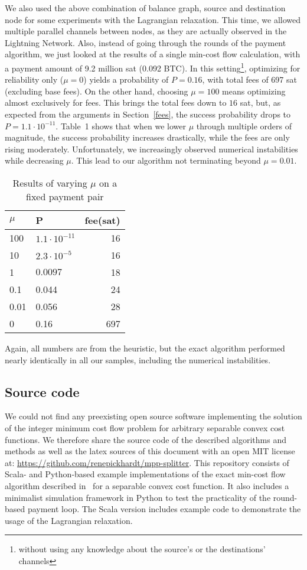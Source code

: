 \documentclass[10pt,twocolumn]{article}
\begin{document}
We also used the above combination of balance graph, source and destination node for some experiments with the Lagrangian relaxation. This time, we allowed multiple parallel channels between nodes, as they are actually observed in the Lightning Network. Also, instead of going through the rounds of the payment algorithm, we just looked at the results of a single min-cost flow calculation, with a payment amount of 9.2 million sat (0.092 BTC). In this setting\footnote{without using any knowledge about the source's or the destinations' channels}, optimizing for reliability only ($\mu=0$) yields a probability of $P=0.16$, with total fees of 697 sat (excluding base fees). On the other hand, choosing $\mu=100$ means optimizing almost exclusively for fees. This brings the total fees down to $16$ sat, but, as expected from the arguments in Section~\ref{fees}, the success probability drops to $P=1.1\cdot10^{-11}$. Table~1 shows that when we lower $\mu$ through multiple orders of magnitude, the success probability increases drastically, while the fees are only rising moderately. Unfortunately, we increasingly observed numerical instabilities while decreasing $\mu$. This lead to our algorithm not terminating beyond $\mu=0.01$.


\begin{table}
\begin{center}
\begin{tabular}[h]{l|l|r}
  $\mu$ & P & fee(sat) \\
  \hline
  100  & $1.1\cdot10^{-11}$ & 16 \\
  10 & $2.3\cdot 10^{-5}$ & 16 \\
  1 & $0.0097$ & 18 \\
  0.1 &  0.044 & 24 \\
  0.01 & 0.056 & 28 \\
  0  & 0.16 & 697
\end{tabular}
\caption{Results of varying $\mu$ on a fixed payment pair}
\end{center}
\label{table:mu}
\end{table}

Again, all numbers are from the heuristic, but the exact algorithm performed nearly identically in all our samples, including the numerical instabilities.

\subsection{Source code}
We could not find any preexisting open source software implementing the solution of the integer minimum cost flow problem for arbitrary separable convex cost functions.
We therefore share the source code of the described algorithms and methods as well as the latex sources of this document with an open MIT license at: \url{https://github.com/renepickhardt/mpp-splitter}.
This repository consists of Scala- and Python-based example implementations of the exact min-cost flow algorithm described in~\cite[p.~556ff]{ahuja1993network} for a separable convex cost function.
It also includes a minimalist simulation framework in Python to test the practicality of the round-based payment loop.
The Scala version includes example code to demonstrate the usage of the Lagrangian relaxation.
\end{document}
